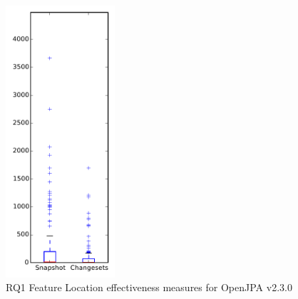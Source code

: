 
\begin{figure}[t]
\centering
\includegraphics[width=0.36\textwidth]{figures/flt/rq1_openjpa}
\caption{RQ1 Feature Location effectiveness measures for OpenJPA v2.3.0}
\label{fig:flt:rq1:openjpa}
\end{figure}
